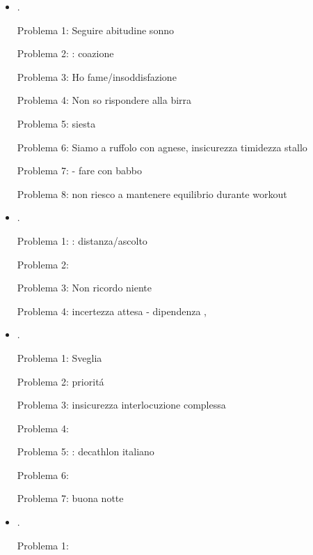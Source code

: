 \begin{itemize}
Problema 1: coazione ripetere 

Problema 2: Mancanza progettazione

Problema 3: Non so gestire la noia (impulsi)

\item {}.

Problema 1: Seguire abitudine sonno

Problema 2: : coazione

Problema 3: Ho fame/insoddisfazione

Problema 4: Non so rispondere alla birra

Problema 5: siesta

Problema 6: Siamo a ruffolo con agnese, insicurezza timidezza stallo

Problema 7:  - fare con babbo

Problema 8: non riesco a mantenere equilibrio durante workout


\item {}.

Problema 1: : distanza/ascolto

Problema 2: 

Problema 3: Non ricordo niente

Problema 4: incertezza attesa - dipendenza , 


\item {}.

Problema 1: Sveglia

Problema 2: priorit\'a

Problema 3: insicurezza interlocuzione complessa

Problema 4: 

Problema 5: : decathlon italiano

Problema 6: 

Problema 7: buona notte

\item {}.

Problema 1: 


\end{itemize}
